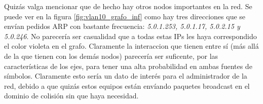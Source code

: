 \par Quiz\'as valga mencionar que de hecho hay otros nodos importantes en la red. Se
puede ver en la figura \ref{fig:vlan10_grafo_inf} como hay tres direcciones que se env\'ian
pedidos ARP con bastante frecuencia: \textit{5.0.1.253, 5.0.1.17, 5.0.2.15 y 5.0.246}.
No parecer\'ia ser casualidad que a todas estas IPs les haya correspondido el color
violeta en el grafo. Claramente la interaccion que tienen entre s\'i (m\'as all\'a de la
que tienen con los dem\'as nodos) parecer\'ia ser suficente, por las caracter\'isticas
de los ejes, para tener una alta probabilidad en ambas fuentes de s\'imbolos. Claramente
esto ser\'ia un dato de inter\'es para el administrador de la red, debido a que quiz\'as
estos equipos est\'an env\'iando paquetes broadcast en el dominio de colisi\'on sin
que haya necesidad.
